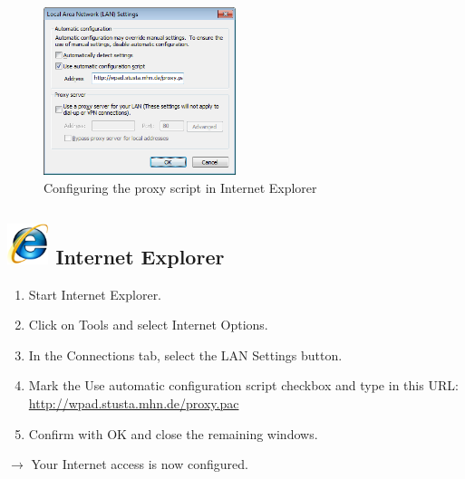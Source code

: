\documentclass[a4paper,12pt]{scrartcl}
\begin{document}
\begin{figure}
  \begin{center}
    \includegraphics[width=0.5\textwidth,keepaspectratio]{Bilder/Proxy_IE_EN}
  \end{center}
  \caption{Configuring the proxy script in Internet Explorer}
\end{figure}

\subsection*{\includegraphics[height=1.2cm,keepaspectratio]{Bilder/Internet_Explorer_7_Logo} Internet Explorer}
\begin{enumerate}
    \item Start Internet Explorer.
    \item Click on Tools and select Internet Options.
    \item In the Connections tab, select the LAN Settings button.
    \item Mark the Use automatic configuration script checkbox and type in this URL: \\ \url{http://wpad.stusta.mhn.de/proxy.pac}
    \item Confirm with OK and close the remaining windows.
\end{enumerate}
$\rightarrow$ Your Internet access is now configured.
\end{document}
